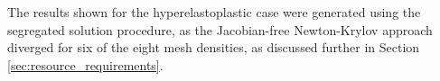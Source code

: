 \documentclass[sn-mathphys,Numbered]{sn-jnl}%
\begin{document}
The results shown for the hyperelastoplastic case were generated using the segregated solution procedure, as the Jacobian-free Newton-Krylov approach diverged for six of the eight mesh densities, as discussed further in Section \ref{sec:resource_requirements}.

\end{document}
